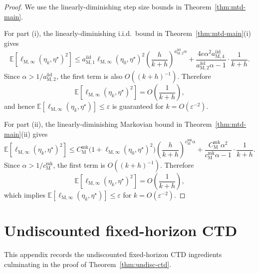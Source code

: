 \documentclass{article}
\begin{document}
\begin{proof}
We use the linearly-diminishing step size bounds in Theorem~\ref{thm:mtd-main}.

For part \textup{(i)}, the linearly-diminishing i.i.d.\ bound in Theorem~\ref{thm:mtd-main}(i) gives
\begin{equation}
\mathbb E\left[\ell_{\mathrm M,\infty}(\eta_k,\eta^\star)^2\right] \le a_{\mathrm M,1}^{\mathrm{iid}}\ell_{\mathrm M,\infty}(\eta_0,\eta^\star)^2 \left(\frac{h}{k+h}\right)^{a_{\mathrm M,2}^{\mathrm{iid}}\alpha} + \frac{4e\alpha^2 a_{\mathrm M,4}^{\mathrm{iid}}}{a_{\mathrm M,2}^{\mathrm{iid}}\alpha-1}\cdot \frac{1}{k+h}.
\end{equation}
Since $\alpha>1/a_{\mathrm M,2}^{\mathrm{iid}}$, the first term is also $O((k+h)^{-1})$. Therefore
\begin{equation}
\mathbb E\left[\ell_{\mathrm M,\infty}(\eta_k,\eta^\star)^2\right] = O\left(\frac{1}{k+h}\right),
\end{equation}
and hence $\mathbb E[\ell_{\mathrm M,\infty}(\eta_k,\eta^\star)]\le\varepsilon$ is guaranteed for $k=O(\varepsilon^{-2})$.

For part \textup{(ii)}, the linearly-diminishing Markovian bound in Theorem~\ref{thm:mtd-main}(ii) gives
\begin{equation}
\mathbb E\left[\ell_{\mathrm M,\infty}(\eta_k,\eta^\star)^2\right] \le C_{\mathrm M}^{\mathrm{mk}}\bigl(1+\ell_{\mathrm M,\infty}(\eta_0,\eta^\star)^2\bigr)\left(\frac{h}{k+h}\right)^{c_{\mathrm M}^{\mathrm{mk}}\alpha}+\frac{C_{\mathrm M}^{\mathrm{mk}}\alpha^2}{c_{\mathrm M}^{\mathrm{mk}}\alpha-1}\cdot\frac{1}{k+h}.
\end{equation}
Since $\alpha>1/c_{\mathrm M}^{\mathrm{mk}}$, the first term is $O((k+h)^{-1})$. Therefore
\begin{equation}
\mathbb E\left[\ell_{\mathrm M,\infty}(\eta_k,\eta^\star)^2\right]=O\left(\frac{1}{k+h}\right),
\end{equation}
which implies $\mathbb E[\ell_{\mathrm M,\infty}(\eta_k,\eta^\star)]\le \varepsilon$ for $k=O(\varepsilon^{-2})$.
\end{proof}

\section{Undiscounted fixed-horizon CTD}
\label{app:fh-ctd}

This appendix records the undiscounted fixed-horizon CTD ingredients culminating in the proof of Theorem~\ref{thm:undisc-ctd}.
\end{document}
